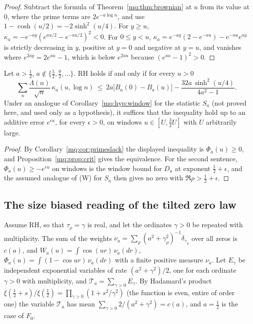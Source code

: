 \begin{proof}
Subtract the formula of Theorem~\ref{mq:thm:brownian} at $u$ from its value at $0$, where the prime terms are $2e^{-a\log n}$, and use $1-\cosh(u/2)=-2\sinh^2(u/4)$. For $y\ge u$, $\kappa_a=-e^{-ay}(e^{au/2}-e^{-au/2})^2<0$. For $0\le y<u$, $\kappa_a=e^{-ay}(2-e^{-au})-e^{-au}e^{ay}$ is strictly decreasing in $y$, positive at $y=0$ and negative at $y=u$, and vanishes where $e^{2ay}=2e^{au}-1$, which is below $e^{2au}$ because $(e^{au}-1)^2>0$.
\end{proof}

\begin{theorem}\label{mq:thm:primeform}
Let $a>\frac12$, $a\notin\{\frac52,\frac92,\dots\}$. RH holds if and only if for every $u>0$
\[
\sum_n\frac{\Lambda(n)}{\sqrt n}\,\kappa_a(u,\log n)\ \le\ 2a\big[B_a(0)-B_a(u)\big]-\frac{32a\,\sinh^2(u/4)}{4a^2-1}.
\]
Under an analogue of Corollary~\ref{mq:hyp:window} for the statistic $S_a$ (not proved here, and used only as a hypothesis), it suffices that the inequality hold up to an additive error $e^{\epsilon u}$, for every $\epsilon>0$, on windows $u\in[U,\frac32U]$ with $U$ arbitrarily large.
\end{theorem}

\begin{proof}
By Corollary~\ref{mq:cor:primeslack} the displayed inequality is $\Phi_a(u)\ge0$, and Proposition~\ref{mq:prop:crit} gives the equivalence. For the second sentence, $\Phi_a(u)\ge-e^{\epsilon u}$ on windows is the window bound for $D_a$ at exponent $\frac12+\epsilon$, and the assumed analogue of (W) for $S_a$ then gives no zero with $\Re\rho>\frac12+\epsilon$.
\end{proof}

\subsection{The size biased reading of the tilted zero law}

Assume RH, so that $\tau_\rho=\gamma$ is real, and let the ordinates $\gamma>0$ be repeated with multiplicity. The sum of the weights $\nu_a=\sum_\rho(a^2+\gamma_\rho^2)^{-1}\delta_{\gamma_\rho}$ over all zeros is $c(a)$, and $W_a(u)=\int\cos(ur)\,\nu_a(dr)$, $\Phi_a(u)=\int(1-\cos ur)\,\nu_a(dr)$ with a finite positive measure $\nu_a$. Let $E_\gamma$ be independent exponential variables of rate $(a^2+\gamma^2)/2$, one for each ordinate $\gamma>0$ with multiplicity, and $\mathcal T_a=\sum_{\gamma>0}E_\gamma$. By Hadamard's product $\xi(\frac12+s)/\xi(\frac12)=\prod_{\gamma>0}(1+s^2/\gamma^2)$ (the function is even, entire of order one) the variable $\mathcal T_a$ has mean $\sum_{\gamma>0}2/(a^2+\gamma^2)=c(a)$, and $a=\frac12$ is the case of $F_0$.

